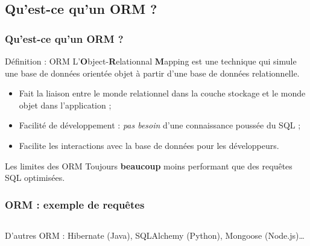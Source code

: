 	\subsection{Qu'est-ce qu'un ORM ?}
	\begin{frame}
		\frametitle{Qu'est-ce qu'un ORM ?}

		\begin{block}{Définition : ORM}
			L'\textbf{O}bject-\textbf{R}elationnal \textbf{M}apping est une technique qui simule une base de données orientée objet à partir d'une base de données relationnelle.
		\end{block}

		\vspace{2px}

		\begin{itemize}
			\item Fait la liaison entre le monde relationnel dans la couche stockage et le monde objet dans l'application ;
			\item Facilité de développement : \textit{pas besoin} d'une connaissance poussée du SQL ;
			\item Facilite les interactions avec la base de données pour les développeurs.
		\end{itemize}

		\vspace{2px}

		\begin{alertblock}{Les limites des ORM}
			Toujours \textbf{beaucoup} moins performant que des requêtes SQL optimisées.
		\end{alertblock}

	\end{frame}

	\begin{frame}
		\frametitle{ORM : exemple de requêtes}

		\begin{listing}[H]
			\inputminted[fontsize=\tiny, linenos=true]{php}{code/eloquent.php}
			\caption{Quelques requêtes basiques avec l'ORM Eloquent (PHP).}
		\end{listing}

		\scriptsize{D'autres ORM : Hibernate (Java), SQLAlchemy (Python), Mongoose (Node.js)\dots}

	\end{frame}